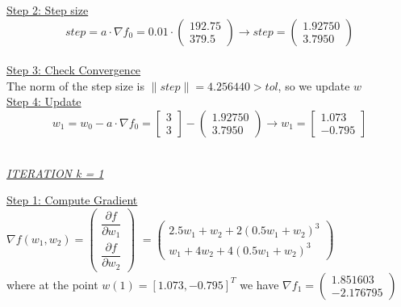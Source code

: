 \underline{Step 2: Step size}
\[
step = a \cdot \nabla f_{0} = 0.01 \cdot \left(\begin{array}{c}
	192.75 \\
	379.5
\end{array}\right) \rightarrow step =\left(\begin{array}{c}
1.92750 \\
3.7950
\end{array}\right)
\]
\\[4mm]

\underline{Step 3: Check Convergence}\\
The norm of the step size is $\| step \| = 4.256440 > tol$, so we update $w$
\\[4mm]

\underline{Step 4: Update}
\[ 
w_1 = w_0 - a\cdot \nabla f_0 =  \left[\begin{array}{c}
	3 \\
	3
\end{array}\right] - \left(\begin{array}{c}
1.92750 \\
3.7950
\end{array}\right) \rightarrow
w_1 = \left[\begin{array}{c}
	 1.073\\
	 -0.795
\end{array}\right]
\]
\\[4mm]

\begin{center}
	\underline{\textit{ITERATION k = 1}}
\end{center}

\underline{Step 1: Compute Gradient}\\
\(\nabla f(w_1,w_2) = \left(\begin{array}{c}
	\dfrac{\partial f}{\partial w_1} \\[4mm]
	\dfrac{\partial f}{\partial w_2}
\end{array}\right)\) $= \left(\begin{array}{c}
	2.5w_1 + w_2 + 2(0.5w_1+w_2)^3\\[1mm]
	w_1 + 4w_2 + 4(0.5w_1+w_2)^3
\end{array}\right)$ \\[3mm]

where at the point $w\left(1\right) = \left[1.073, -0.795\right]^T$ we have $\nabla f_{1} = \left(\begin{array}{c}
	1.851603 \\
	-2.176795
\end{array}\right)$
\\[4mm]

